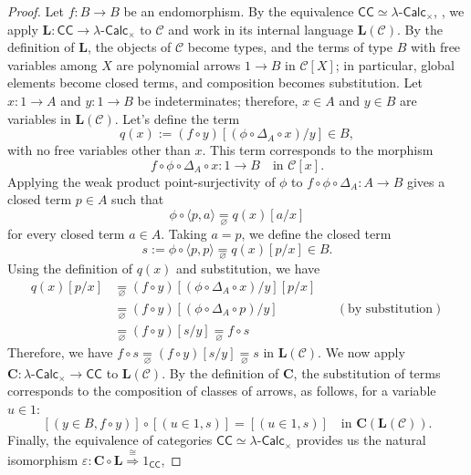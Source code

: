 \begin{proof}
    Let $f : B \to B$ be an endomorphism.
    By the equivalence $\mathsf{CC} \simeq \lambda\text{-}\mathsf{Calc}_\times$, , we apply $\mathbf L : \mathsf{CC} \to \lambda\text{-}\mathsf{Calc}_\times$ to $\mathcal C$ and work in its internal language $\mathbf L(\mathcal C)$.
    By the definition of $\mathbf L$, the objects of $\mathcal C$ become types, and the terms of type $B$ with free variables among $X$ are polynomial arrows $1 \to B$ in $\mathcal C[X]$; in particular, global elements become closed terms, and composition becomes substitution.
    Let $x : 1 \to A$ and $y : 1 \to B$ be indeterminates; therefore, $x \in A$ and $y \in B$ are variables in $\mathbf L(\mathcal C)$. Let's define the term
    \[ q(x) := (f \circ y)[(\phi \circ \Delta_A \circ x)/y] \in B, \]
    with no free variables other than $x$. This term corresponds to the morphism
    \[ f \circ \phi \circ \Delta_A \circ x : 1 \to B \quad \text{in } \mathcal C[x]. \]
    Applying the weak product point-surjectivity of $\phi$ to $f \circ \phi \circ \Delta_A : A \to B$ gives a closed term $p \in A$ such that
    \[ \phi \circ \langle p,a \rangle \underset{\varnothing}{=} q(x)[a/x] \]
    for every closed term $a \in A$. Taking $a=p$, we define the closed term
    \[ s := \phi \circ \langle p,p \rangle \underset{\varnothing}{=} q(x)[p/x] \in B. \]
    Using the definition of $q(x)$ and substitution, we have
    \begin{align*}
        q(x)[p/x] &\underset{\varnothing}{=} (f \circ y)[(\phi \circ \Delta_A \circ x)/y][p/x] \\
                  &\underset{\varnothing}{=} (f \circ y)[(\phi \circ \Delta_A \circ p)/y] &&(\text{by substitution}) \\
                  &\underset{\varnothing}{=} (f \circ y)[s/y] \underset{\varnothing}{=} f \circ s
    \end{align*}
    Therefore, we have $f \circ s \underset{\varnothing}{=} (f \circ y) [s/y] \underset{\varnothing}{=} s$ in $\mathbf L(\mathcal C)$.
    We now apply $\mathbf C : \lambda\text{-}\mathsf{Calc}_\times \to \mathsf{CC}$ to $\mathbf L(\mathcal C)$. By the definition of $\mathbf C$,
    the substitution of terms corresponds to the composition of classes of arrows, as follows, for a variable $u \in 1$:
    \[ [(y \in B,f \circ y)] \circ [(u \in 1,s)] = [(u \in 1,s)] \quad\text{in } \mathbf C(\mathbf L(\mathcal C)). \]
    Finally, the equivalence of categories $\mathsf{CC} \simeq \lambda\text{-}\mathsf{Calc}_\times$ provides us the natural isomorphism $\varepsilon : \mathbf C \circ \mathbf L \overset{\cong}{\Rightarrow} 1_{\mathsf{CC}}$,

\end{proof}
